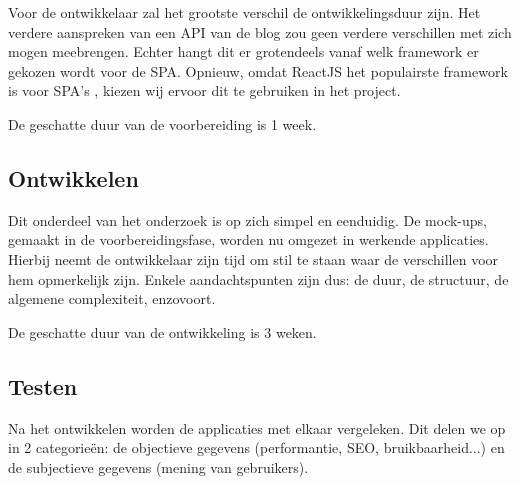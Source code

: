 \documentclass{hogent-article}
\begin{document}
Voor de ontwikkelaar zal het grootste verschil de ontwikkelingsduur zijn.
Het verdere aanspreken van een API van de blog zou geen verdere verschillen met zich mogen meebrengen.
Echter hangt dit er grotendeels vanaf welk framework er gekozen wordt voor de SPA.
Opnieuw, omdat ReactJS het populairste framework is voor SPA's \autocite{Gathoni2022}, kiezen wij ervoor dit te gebruiken in het project.

De geschatte duur van de voorbereiding is 1 week.

\subsection{Ontwikkelen}
Dit onderdeel van het onderzoek is op zich simpel en eenduidig.
De mock-ups, gemaakt in de voorbereidingsfase, worden nu omgezet in werkende applicaties.
Hierbij neemt de ontwikkelaar zijn tijd om stil te staan waar de verschillen voor hem opmerkelijk zijn.
Enkele aandachtspunten zijn dus:
de duur,
de structuur,
de algemene complexiteit,
enzovoort.

De geschatte duur van de ontwikkeling is 3 weken.

\subsection{Testen}
Na het ontwikkelen worden de applicaties met elkaar vergeleken.
Dit delen we op in 2 categorieën:
de objectieve gegevens (performantie, SEO, bruikbaarheid...) en de subjectieve gegevens (mening van gebruikers).
\end{document}

